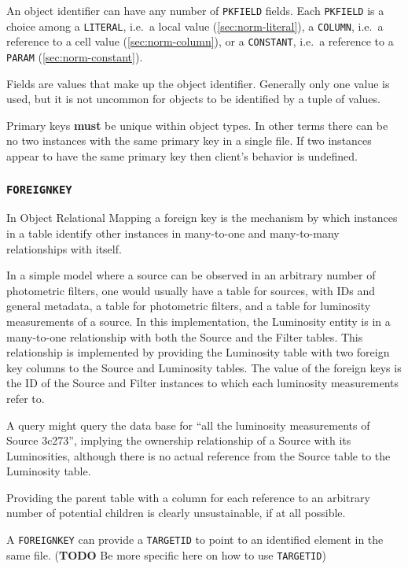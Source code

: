\documentclass[11pt,a4paper]{ivoa}
\begin{document}
An object identifier can have any number of \texttt{PKFIELD} fields.
Each \texttt{PKFIELD} is a choice among a \texttt{LITERAL}, i.e.~a local
value (\ref{sec:norm-literal}), a \texttt{COLUMN}, i.e.~a reference to
a cell value (\ref{sec:norm-column}), or a \texttt{CONSTANT}, i.e.~a
reference to a \texttt{PARAM} (\ref{sec:norm-constant}).

Fields are values that make up the object identifier. Generally only one
value is used, but it is not uncommon for objects to be identified by a
tuple of values.

Primary keys \textbf{must} be unique within object types. In other terms
there can be no two instances with the same primary key in a single
file. If two instances appear to have the same primary key then client's
behavior is undefined.

\subsubsection{\texttt{FOREIGNKEY}}\label{sec:norm-foreign}

In Object Relational Mapping a foreign key is the mechanism by which
instances in a table identify other instances in many-to-one and
many-to-many relationships with itself.

In a simple model where a source can be observed in an arbitrary number
of photometric filters, one would usually have a table for sources, with
IDs and general metadata, a table for photometric filters, and a table
for luminosity measurements of a source. In this implementation, the
Luminosity entity is in a many-to-one relationship with both the Source
and the Filter tables. This relationship is implemented by providing the
Luminosity table with two foreign key columns to the Source and
Luminosity tables. The value of the foreign keys is the ID of the Source
and Filter instances to which each luminosity measurements refer to.

A query might query the data base for ``all the luminosity measurements
of Source 3c273'', implying the ownership relationship of a Source with
its Luminosities, although there is no actual reference from the Source
table to the Luminosity table.

Providing the parent table with a column for each reference to an
arbitrary number of potential children is clearly unsustainable, if at
all possible.

A \texttt{FOREIGNKEY} can provide a \texttt{TARGETID} to point to an
identified element in the same file. (\textbf{TODO} Be more specific
here on how to use \texttt{TARGETID})
\end{document}
